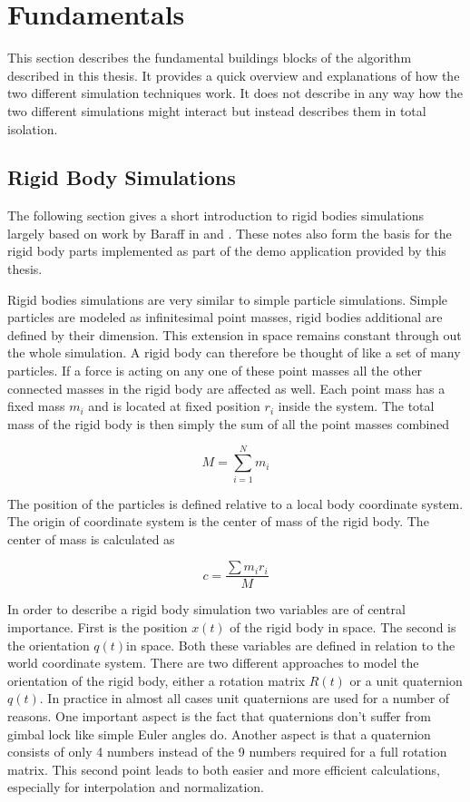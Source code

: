 \chapter{Fundamentals}
\label{cha:fundamentals}

This section describes the fundamental buildings blocks of the algorithm described in this thesis. It provides a quick overview and explanations of how the two different simulation techniques work. It does not describe in any way how the two different simulations might interact but instead describes them in total isolation.

\section{Rigid Body Simulations}
\label{sec:rigid_body_simulations}

The following section gives a short introduction to rigid bodies simulations largely based on work by Baraff in \cite{Baraff:1997uh} and \cite{Baraff:1997wq}. These notes also form the basis for the rigid body parts implemented as part of the demo application provided by this thesis.

Rigid bodies simulations are very similar to simple particle simulations. Simple particles are modeled as infinitesimal point masses, rigid bodies additional are defined by their dimension. This extension in space remains constant through out the whole simulation. A rigid body can therefore be thought of like a set of many particles. If a force is acting on any one of these point masses all the other connected masses in the rigid body are affected as well. Each point mass has a fixed mass $m_i$ and is located at fixed position $r_i$ inside the system. The total mass of the rigid body is then simply the sum of all the point masses combined

\[
M = \sum\limits_{i=1}^N m_i
\]

The position of the particles is defined relative to a local body coordinate system. The origin of coordinate system is the center of mass of the rigid body. The center of mass is calculated as 

\[
c = \frac{\sum m_i r_i}{M}
\]

In order to describe a rigid body simulation two variables are of central importance. First is the position \(x(t)\) of the rigid body in space. The second is the orientation \(q(t)\)in space. Both these variables are defined in relation to the world coordinate system. There are two different approaches to model the orientation of the rigid body, either a rotation matrix $R(t)$ or a unit quaternion $q(t)$. In practice in almost all cases unit quaternions are used for a number of reasons. One important aspect is the fact that quaternions don't suffer from gimbal lock like simple Euler angles do. Another aspect is that a quaternion consists of only 4 numbers instead of the 9 numbers required for a full rotation matrix. This second point leads to both easier and more efficient calculations, especially for interpolation and normalization.

